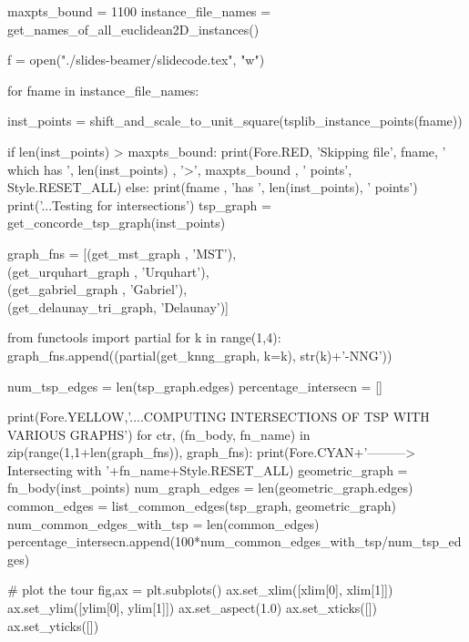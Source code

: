      maxpts_bound        = 1100
     instance_file_names = get_names_of_all_euclidean2D_instances()

     f = open("./slides-beamer/slidecode.tex", "w")

     for fname in instance_file_names:

        inst_points = shift_and_scale_to_unit_square(tsplib_instance_points(fname))

        if len(inst_points) > maxpts_bound:
              print(Fore.RED, 'Skipping file', fname, ' which has ', len(inst_points) , '>', maxpts_bound , ' points', Style.RESET_ALL)
        else:
              print(fname , 'has ', len(inst_points), ' points')
              print('...Testing for intersections')
              tsp_graph = get_concorde_tsp_graph(inst_points)
              
              graph_fns = [(get_mst_graph         , 'MST'), \\
                           (get_urquhart_graph    , 'Urquhart'), \\
                           (get_gabriel_graph     , 'Gabriel'),\\
                           (get_delaunay_tri_graph, 'Delaunay')]

              from functools import partial
              for k in range(1,4): 
                     graph_fns.append((partial(get_knng_graph, k=k), str(k)+'-NNG'))

              num_tsp_edges        = len(tsp_graph.edges)
              percentage_intersecn = []  
     
              print(Fore.YELLOW,'....COMPUTING INTERSECTIONS OF TSP WITH VARIOUS GRAPHS')
              for ctr, (fn_body, fn_name) in zip(range(1,1+len(graph_fns)), graph_fns):
                      print(Fore.CYAN+'---------> Intersecting with '+fn_name+Style.RESET_ALL)
                      geometric_graph           = fn_body(inst_points)
                      num_graph_edges           = len(geometric_graph.edges)
                      common_edges              = list_common_edges(tsp_graph, geometric_graph)
                      num_common_edges_with_tsp = len(common_edges)
                      percentage_intersecn.append(100*num_common_edges_with_tsp/num_tsp_edges)

              # plot the tour
              fig,ax = plt.subplots()
              ax.set_xlim([xlim[0], xlim[1]])
              ax.set_ylim([ylim[0], ylim[1]])
              ax.set_aspect(1.0)
              ax.set_xticks([])
              ax.set_yticks([])
 
